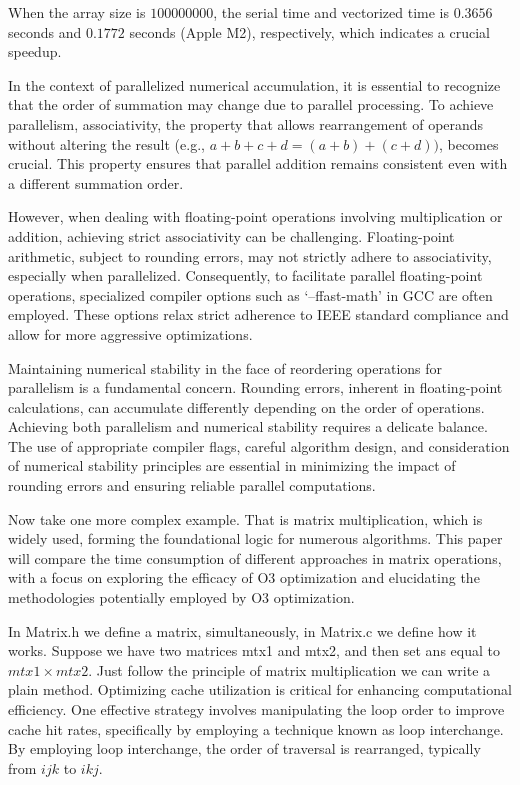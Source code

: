\documentclass[conference]{IEEEtran}
\begin{document}
When the array size is $100000000$, the serial time and vectorized time is $0.3656$ seconds and $0.1772$ seconds (Apple M2), respectively, which indicates a crucial speedup.

In the context of parallelized numerical accumulation, it is essential to recognize that the order of summation may change due to parallel processing. To achieve parallelism, associativity, the property that allows rearrangement of operands without altering the result (e.g., $a+b+c+d=(a+b)+(c+d))$, becomes crucial. This property ensures that parallel addition remains consistent even with a different summation order.

However, when dealing with floating-point operations involving multiplication or addition, achieving strict associativity can be challenging. Floating-point arithmetic, subject to rounding errors, may not strictly adhere to associativity, especially when parallelized. Consequently, to facilitate parallel floating-point operations, specialized compiler options such as `--ffast-math' in GCC are often employed. These options relax strict adherence to IEEE standard compliance and allow for more aggressive optimizations.

Maintaining numerical stability in the face of reordering operations for parallelism is a fundamental concern. Rounding errors, inherent in floating-point calculations, can accumulate differently depending on the order of operations. Achieving both parallelism and numerical stability requires a delicate balance. The use of appropriate compiler flags, careful algorithm design, and consideration of numerical stability principles are essential in minimizing the impact of rounding errors and ensuring reliable parallel computations.

Now take one more complex example. That is matrix multiplication, which is widely used, forming the foundational logic for numerous algorithms. This paper will compare the time consumption of different approaches in matrix operations, with a focus on exploring the efficacy of O3 optimization and elucidating the methodologies potentially employed by O3 optimization.

In Matrix.h we define a matrix, simultaneously, in Matrix.c we define how it works. Suppose we have two matrices mtx1 and mtx2, and then set ans equal to $mtx1 \times mtx2$. Just follow the principle of matrix multiplication we can write a plain method. Optimizing cache utilization is critical for enhancing computational efficiency. One effective strategy involves manipulating the loop order to improve cache hit rates, specifically by employing a technique known as loop interchange. By employing loop interchange, the order of traversal is rearranged, typically from $ijk$ to $ikj$.
\end{document}

